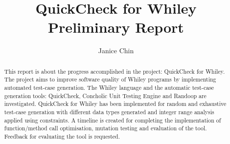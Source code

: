 \documentclass[11pt
              , a4paper
              , oneside
              , openright
              ]{article}
\title{QuickCheck for Whiley Preliminary Report}
\author{Janice Chin}
\date{}
\begin{document}
\frontmatter



\begin{abstract}
This report is about the progress accomplished in the project: QuickCheck for Whiley. 
The project aims to improve software quality of Whiley programs by implementing automated test-case generation. 
The Whiley language and the automatic test-case generation tools: QuickCheck, Concholic Unit Testing Engine and Randoop are investigated.
QuickCheck for Whiley has been implemented for random and exhaustive test-case generation with different data types generated and integer range analysis applied using constraints.
A timeline is created for completing the implementation of function/method call optimisation, mutation testing and evaluation of the tool. 
Feedback for evaluating the tool is requested.
\end{abstract}


\maketitle

\tableofcontents



\mainmatter










\backmatter




%


\appendix


\end{document}

